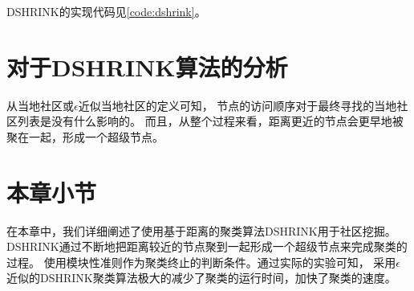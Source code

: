 DSHRINK的实现代码见\ref{code:dshrink}。

\section{对于DSHRINK算法的分析}

从当地社区或$\epsilon$近似当地社区的定义可知，
节点的访问顺序对于最终寻找的当地社区列表是没有什么影响的。
而且，从整个过程来看，距离更近的节点会更早地被聚在一起，形成一个超级节点。

\section{本章小节}

在本章中，我们详细阐述了使用基于距离的聚类算法DSHRINK用于社区挖掘。
DSHRINK通过不断地把距离较近的节点聚到一起形成一个超级节点来完成聚类的过程。
使用模块性准则作为聚类终止的判断条件。通过实际的实验可知，
采用$\epsilon$近似的DSHRINK聚类算法极大的减少了聚类的运行时间，加快了聚类的速度。
